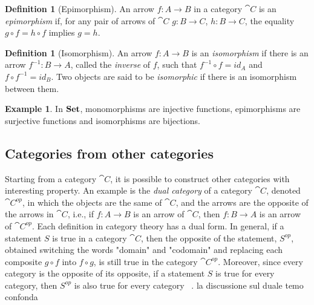 \documentclass[a4paper, twoside,openright]{report}
\theoremstyle{plain}
\theoremstyle{definition}
\newtheorem{definition}[theorem]{Definition}
\newtheorem{example}[theorem]{Example}
\begin{document}
\begin{definition}[Epimorphism]\label{def:epi}
    An arrow $f: A\rightarrow B$ in a category $\cat{C}$ is an \emph{epimorphism} if, for any pair of arrows of $\cat{C}$ $g : B \rightarrow C$, $h: B \rightarrow C$, the equality $g \circ f = h \circ f$ implies $g = h$.
\end{definition}

\begin{definition}[Isomorphism]\label{def:iso}
    An arrow $f:A \rightarrow B$ is an \emph{isomorphism} if there is an arrow $f^{-1}:B \rightarrow A$, called the \emph{inverse} of $f$, such that $f^{-1}\circ f = id_{A}$ and $f \circ f^{-1} = id_{B}$. Two objects are said to be \emph{isomorphic} if there is an isomorphism between them.
\end{definition}

\begin{example}
    In $\mathbf{Set}$, monomorphisms are injective functions, epimorphisms are surjective functions and isomorphisms are bijections.
\end{example}

\subsection{Categories from other categories}\label{ssect:cats_from_cats}

Starting from a category $\cat{C}$, it is possible to construct other categories with interesting property.
An example is the \emph{dual category} of a category $\cat{C}$, denoted $\cat{C}^{op}$, in which the objects are the same of $\cat{C}$, and the arrows are the opposite of the arrows in $\cat{C}$, i.e., if $f: A \rightarrow B$ is an arrow of $\cat{C}$, then $f: B \rightarrow A$ is an arrow of $\cat{C}^{op}$.
Each definition in category theory has a dual form. In general, if a statement $S$ is true in a category $\cat{C}$, then the opposite of the statement, $S^{op}$, obtained switching the words "domain" and "codomain" and replacing each composite $g \circ f$ into $f \circ g$, is still true in the category $\cat{C}^{op}$. Moreover, since every category is the opposite of its opposite, if a statement $S$ is true for every category, then $S^{op}$ is also true for every category ~\cite[pp8-9]{pierce91}. {\color{red} la discussione sul duale temo confonda}
\end{document}
